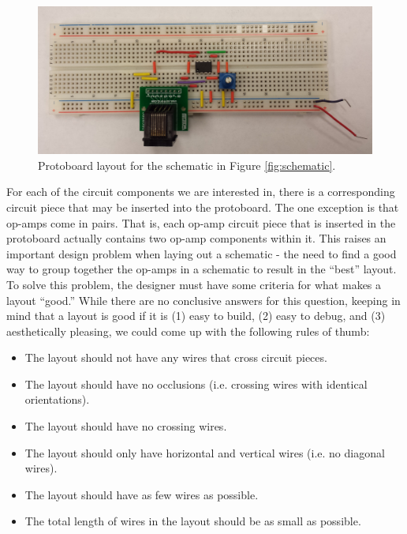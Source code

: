 \begin{figure}
\begin{center}
\includegraphics[width=\textwidth]{Images/sample_physical_layout.jpg}
\caption{Protoboard layout for the schematic in Figure \ref{fig:schematic}.}
\label{fig:eg_s_to_pb}
\end{center}
\end{figure}

For each of the circuit components we are interested in, there is a corresponding
circuit piece that may be inserted into the protoboard. The one exception is that
op-amps come in pairs. That is, each op-amp circuit piece that is inserted in the
protoboard actually contains two op-amp components within it. This raises an
important design problem when laying out a schematic - the need to find a
good way to group together the op-amps in a schematic to result in the ``best''
layout. To solve this problem, the designer must have some criteria for what
makes a layout ``good.'' While there are no conclusive answers for this
question, keeping in mind that a layout is good if it is (1) easy to build, (2)
easy to debug, and (3) aesthetically pleasing, we could come up with the
following rules of thumb:

\begin{itemize}
\item The layout should not have any wires that cross circuit pieces.
\item The layout should have no occlusions (i.e. crossing wires with identical
orientations).
\item The layout should have no crossing wires.
\item The layout should only have horizontal and vertical wires (i.e. no
diagonal wires).
\item The layout should have as few wires as possible.
\item The total length of wires in the layout should be as small as possible.
\end{itemize}

